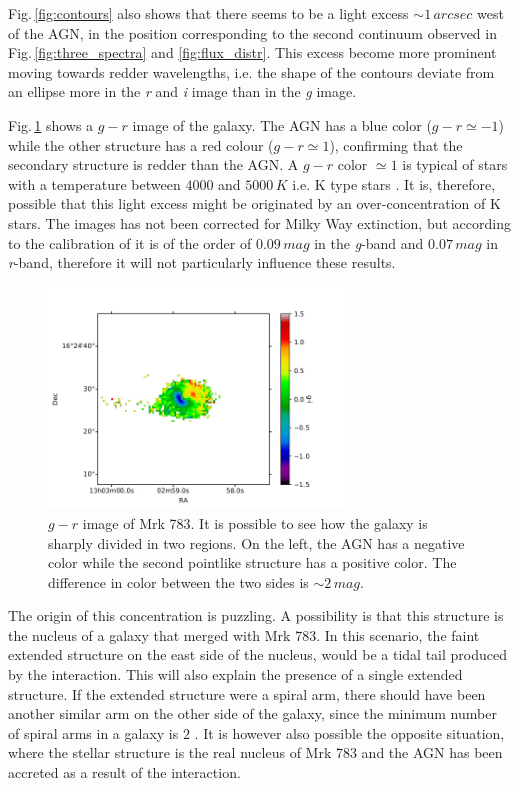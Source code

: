 \documentclass[../main.tex]{subfiles}
\begin{document}
Fig.\,\ref{fig:contours} also shows that there seems to be a light excess $\sim 1\,\si{arcsec}$ west of the AGN, in the position corresponding to the second continuum observed in Fig.\,\ref{fig:three_spectra} and \ref{fig:flux_distr}.
This excess become more prominent moving towards redder wavelengths, i.e. the shape of the contours deviate from an ellipse more in the \emph{r} and \emph{i} image than in the \emph{g} image.

Fig.\,\ref{fig:mrk_gr} shows a $g-r$ image of the galaxy.
The AGN has a blue color ($g-r \simeq -1$) while the other structure has a red colour ($g-r\simeq 1$), confirming that the secondary structure is redder than the AGN.
A $g-r$ color $\simeq 1$ is typical of stars with a temperature between $4000$ and $5000\,\si{K}$ i.e. K type stars \citep{Fukugita11}.
It is, therefore, possible that this light excess might be originated by an over-concentration of K stars.
The images has not been corrected for Milky Way extinction, but according to the calibration of \citet{Schlafly11} it is of the order of $0.09\,\si{mag}$ in the \emph{g}-band and $0.07\,\si{mag}$ in \emph{r}-band, therefore it will not particularly influence these results.

\begin{figure}
\centering
\includegraphics[width=0.7\textwidth]{images/paper3/mrk783color.jpg} 
\caption[]{$g-r$ image of Mrk 783. It is possible to see how the galaxy is sharply divided in two regions. On the left, the AGN has a negative color while the second pointlike structure has a positive color. The difference in color between the two sides is $\sim 2\,\si{mag}$.} 
\label{fig:mrk_gr}
\end{figure} 

The origin of this concentration is puzzling.
A possibility is that this structure is the nucleus of a galaxy that merged with Mrk 783. 
In this scenario, the faint extended structure on the east side of the nucleus, would be a tidal tail produced by the interaction.
This will also explain the presence of a single extended structure.
If the extended structure were a spiral arm, there should have been another similar arm on the other side of the galaxy, since the minimum number of spiral arms in a galaxy is $2$ \citep{Donghia15}.
It is however also possible the opposite situation, where the stellar structure is the real nucleus of Mrk 783 and the AGN has been accreted as a result of the interaction.
\end{document}
